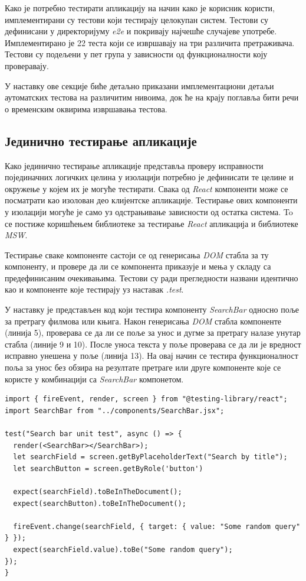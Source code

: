 \documentclass[12pt,oneside]{memoir}
\begin{document}
Како је потребно тестирати апликацију на начин како је корисник користи, имплементирани су тестови који тестирају целокупан систем. Тестови су дефинисани у директоријуму \textit{e2e} и покривају најчешће случајеве употребе. Имплементирано је 22 теста који се извршавају на три различита претраживача.  Тестови су подељени у пет група у зависности од функционалности коју проверавају.

У наставку ове секције биће детаљно приказани имплементациони детаљи аутоматских тестова на различитим нивоима, док ће на крају поглавља бити речи о временским оквирима извршавања тестова.

\subsection{Јединично тестирање апликације}

Како јединично тестирање апликације представља проверу исправности појединачних логичких целина у изолацији потребно је дефинисати те целине и окружење у којем их је могуће тестирати. Свака од \textit{React} компоненти може се посматрати као изолован део клијентске апликације. Тестирање ових компоненти у изолацији могуће је само уз одстрањивање зависности од остатка система. To се постиже коришћењем библиотеке за тестирање \textit{React} апликација и библиотеке \textit{MSW}.

Тестирање сваке компоненте састоји се од генерисања \textit{DOM} стабла за ту компоненту, и провере да ли се компонента приказује и мења у складу са предефинисаним очекивањима. Тестови су ради прегледности названи идентично као и компоненте које тестирају уз наставак \textit{.test}. 

У наставку је представљен код који тестира компоненту \textit{SearchBar} односно поље за претрагу филмова или књига. Након генерисања \textit{DOM} стабла компоненте (линија 5), проверава се да ли се поље за унос и дугме за претрагу налазе унутар стабла (линије 9 и 10). После уноса текста у поље проверава се да ли је вредност исправно унешена у поље (линија 13). На овај начин се тестира функционалност поља за унос без обзира на резултате претраге или друге компоненте које се користе у комбинацији са \textit{SearchBar} компонетом.

\begin{lstlisting}[caption=Јединично тестирање \textit{SearchBar} компоненте,
label={lst:searchbarTest},
frame=single]
import { fireEvent, render, screen } from "@testing-library/react";
import SearchBar from "../components/SearchBar.jsx";

test("Search bar unit test", async () => {
  render(<SearchBar></SearchBar>);
  let searchField = screen.getByPlaceholderText("Search by title");
  let searchButton = screen.getByRole('button')
  
  expect(searchField).toBeInTheDocument();
  expect(searchButton).toBeInTheDocument();

  fireEvent.change(searchField, { target: { value: "Some random query" } });
  expect(searchField.value).toBe("Some random query");
});
}
\end{lstlisting}
\end{document}
